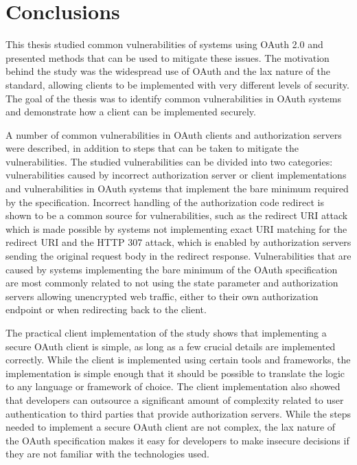 \clearpage

\section{Conclusions}
\label{sec:conclusions}

This thesis studied common vulnerabilities of systems using OAuth 2.0 and presented methods that can be used to mitigate these issues.
The motivation behind the study was the widespread use of OAuth and the lax nature of the standard, allowing clients to be implemented with very different levels of security.
The goal of the thesis was to identify common vulnerabilities in OAuth systems and demonstrate how a client can be implemented securely.

A number of common vulnerabilities in OAuth clients and authorization servers were described, in addition to steps that can be taken to mitigate the vulnerabilities.
The studied vulnerabilities can be divided into two categories: vulnerabilities caused by incorrect authorization server or client implementations and vulnerabilities in OAuth systems that implement the bare minimum required by the specification.
Incorrect handling of the authorization code redirect is shown to be a common source for vulnerabilities, such as the redirect URI attack which is made possible by systems not implementing exact URI matching for the redirect URI and the HTTP 307 attack, which is enabled by authorization servers sending the original request body in the redirect response.
Vulnerabilities that are caused by systems implementing the bare minimum of the OAuth specification are most commonly related to not using the state parameter and authorization servers allowing unencrypted web traffic, either to their own authorization endpoint or when redirecting back to the client.

The practical client implementation of the study shows that implementing a secure OAuth client is simple, as long as a few crucial details are implemented correctly.
While the client is implemented using certain tools and frameworks, the implementation is simple enough that it should be possible to translate the logic to any language or framework of choice.
The client implementation also showed that developers can outsource a significant amount of complexity related to user authentication to third parties that provide authorization servers.
While the steps needed to implement a secure OAuth client are not complex, the lax nature of the OAuth specification makes it easy for developers to make insecure decisions if they are not familiar with the technologies used.

